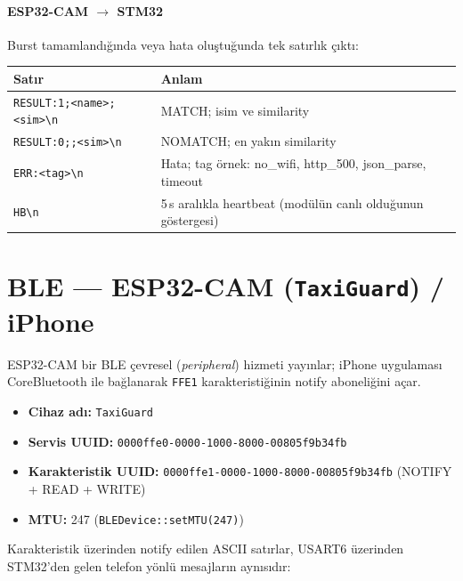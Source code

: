 \paragraph{ESP32-CAM $\rightarrow$ STM32}

Burst tamamlandığında veya hata oluştuğunda tek satırlık çıktı:

\begin{tabular}{l l}
\toprule
\textbf{Satır}                                       & \textbf{Anlam}\\
\midrule
\texttt{RESULT:1;<name>;<sim>\textbackslash n}       & MATCH; isim ve similarity\\
\texttt{RESULT:0;;<sim>\textbackslash n}             & NOMATCH; en yakın similarity\\
\texttt{ERR:<tag>\textbackslash n}                   & Hata; tag örnek: no\_wifi, http\_500, json\_parse, timeout\\
\texttt{HB\textbackslash n}                          & 5\,s aralıkla heartbeat (modülün canlı olduğunun göstergesi)\\
\bottomrule
\end{tabular}

\section{BLE --- ESP32-CAM (\texttt{TaxiGuard}) / iPhone}

ESP32-CAM bir BLE çevresel (\emph{peripheral}) hizmeti yayınlar; iPhone
uygulaması CoreBluetooth ile bağlanarak \texttt{FFE1} karakteristiğinin
notify aboneliğini açar.

\begin{itemize}
    \item \textbf{Cihaz adı:} \texttt{TaxiGuard}
    \item \textbf{Servis UUID:} \texttt{0000ffe0-0000-1000-8000-00805f9b34fb}
    \item \textbf{Karakteristik UUID:} \texttt{0000ffe1-0000-1000-8000-00805f9b34fb}
          (NOTIFY + READ + WRITE)
    \item \textbf{MTU:} 247 (\texttt{BLEDevice::setMTU(247)})
\end{itemize}

Karakteristik üzerinden notify edilen ASCII satırlar, USART6 üzerinden
STM32'den gelen telefon yönlü mesajların aynısıdır:

